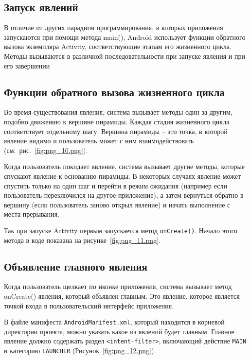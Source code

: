 \subsection{Запуск явлений}
В отличие от других парадигм программирования, в которых приложения
запускаются при помощи метода main(), Android использует функции
обратного вызова экземпляра Activity, соответствующие этапам его
жизненного цикла. Методы вызываются в различной последовательности при
запуске явления и при его завершении

\subsection{Функции обратного вызова жизненного цикла}
Во время существования явления, система вызывает методы один за другим,
подобно движению к вершине пирамиды. Каждая стадия жизненного цикла
соответствует отдельному шагу. Вершина пирамиды – это точка, в которой
явление видимо и пользователь может с ним взаимодействовать
(см.~рис.~\ref{fig:png_10.png}).\par
Когда пользователь покидает явление, система вызывает другие методы,
которые спускают явление к основанию пирамиды. В некоторых случаях
явление может спустить только на один шаг и перейти в режим ожидания
(например если пользователь переключился на другое приложение), а затем
вернуться обратно в вершину (если пользователь заново открыл явление) и
начать выполнение с места прерывания.

Так при запуске Activity первым запускается метод \texttt{onCreate()}.
Начало этого метода в коде показана
на рисунке~\ref{fig:png_11.png}.

\subsection{Объявление главного явления}
Когда пользователь щелкает по иконке приложения, система
вызывает метод onCreate() явления, который объявлен главным. Это
явление, которое является точкой входа в пользовательский интерфейс
приложения.\par
В файле манифеста \texttt{AndroidManifest.xml}, который находится в корневой
директории проекта, можно указать какое из явлений будет главным.
Главное явление должно содержать раздел \texttt{<intent-filter>},
включающий действие \texttt{MAIN} и категорию \texttt{LAUNCHER}
(Рисунок~\ref{fig:png_12.png}).

